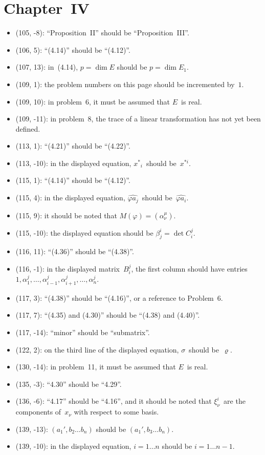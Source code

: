 \documentclass[letterpaper,12pt]{article}
\begin{document}
\section*{Chapter~IV}
\begin{itemize}
\item (105, -8): ``Proposition~II'' should be ``Proposition~III''.
\item (106, 5): ``(4.14)'' should be ``(4.12)''.
\item (107, 13): in~(4.14), \(p=\dim E\) should be \(p=\dim E_1\).
\item (109, 1): the problem numbers on this page should be incremented by~\(1\).
\item (109, 10): in problem~6, it must be assumed that \(E\)~is real.
\item (109, -11): in problem~8, the trace of a linear transformation has not yet been defined.
\item (113, 1): ``(4.21)'' should be ``(4.22)''.
\item (113, -10): in the displayed equation, \({x^*}_i\)~should be~\(x^{*i}\).
\item (115, 1): ``(4.14)'' should be ``(4.12)''.
\item (115, 4): in the displayed equation, \(\widehat{\varphi a_j}\)~should be~\(\widehat{\varphi a_i}\).
\item (115, 9): it should be noted that \(M(\varphi)=(\alpha^{\mu}_{\nu})\).
\item (115, -10): the displayed equation should be \(\beta^i_j=\det C^j_i\).
\item (116, 11): ``(4.36)'' should be ``(4.38)''.
\item (116, -1): in the displayed matrix~\(B^j_i\), the first column should have entries \(1,\alpha^j_1,\ldots,\alpha^j_{i-1},\alpha^j_{i+1},\ldots,\alpha^j_n\).
\item (117, 3): ``(4.38)'' should be ``(4.16)'', or a reference to Problem~6.
\item (117, 7): ``(4.35) and (4.30)'' should be ``(4.38) and (4.40)''.
\item (117, -14): ``minor'' should be ``submatrix''.
\item (122, 2): on the third line of the displayed equation, \(\sigma\)~should be~\(\varrho\).
\item (130, -14): in problem~11, it must be assumed that \(E\)~is real.
\item (135, -3): ``4.30'' should be ``4.29''.
\item (136, -6): ``4.17'' should be ``4.16'', and it should be noted that \(\xi^i_{\nu}\)~are the components of~\(x_{\nu}\) with respect to some basis.
\item (139, -13): \((a_1',b_2\ldots b_n)\) should be \((a_1',b_3\ldots b_n)\).
\item (139, -10): in the displayed equation, \(i=1\ldots n\) should be \(i=1\ldots n-1\).
\end{itemize}
\end{document}
